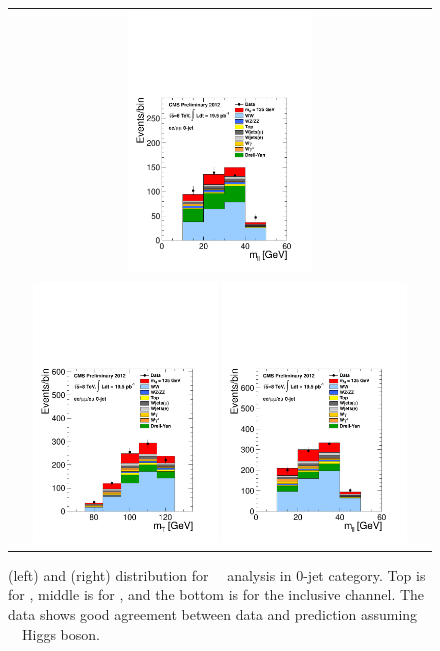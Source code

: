 \begin{figure}[htp]
\begin{tabular}{c}
\includegraphics[width=0.45\textwidth]{figures/hww_analysis17_125_ALL_sf_0j_mll.pdf}
\\
\includegraphics[width=0.45\textwidth]{figures/hww_analysis17_125_ALL_incl_0j_mt.pdf}
\includegraphics[width=0.45\textwidth]{figures/hww_analysis17_125_ALL_incl_0j_mll.pdf}
\end{tabular} 
\caption{ \mT(left) and \mll(right) distribution for ~\GeV\ analysis 
in 0-jet category. 
Top is for \DF, middle is for \SF, and the bottom is for the inclusive channel.  
The data shows good agreement between data and prediction assuming ~\GeV\ Higgs boson.} 
\label{fig:cutbased125_0jet} 
\end{figure} 
